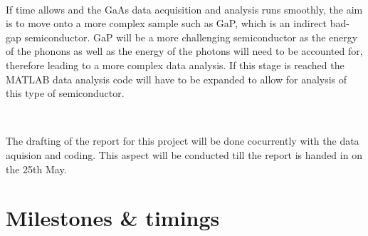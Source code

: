 \documentclass{article}
\begin{document}
\

If time allows and the GaAs data acquisition and analysis runs smoothly, the aim is to move onto a more complex sample such as GaP, which is an indirect bad-gap semiconductor. GaP will be a more challenging semiconductor as the energy of the phonons as well as the energy of the photons will need to be accounted for, therefore leading to a more complex data analysis. If this stage is reached the MATLAB data analysis code will have to be expanded to allow for analysis of this type of semiconductor. 

\ 

The drafting of the report for this project will be done cocurrently with the data aquision and coding. This aspect will be conducted till the report is handed in on the 25th May.

\section*{Milestones \& timings}
	
\end{document}
